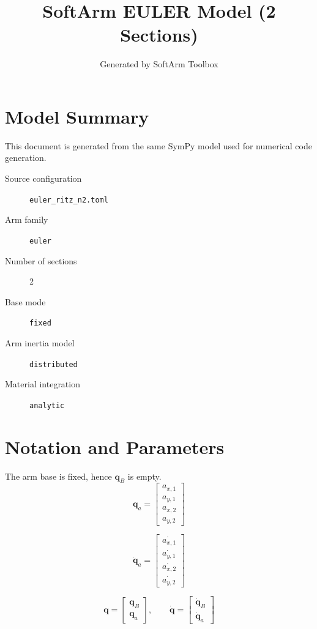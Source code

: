 \documentclass[11pt]{article}
\title{SoftArm EULER Model (2 Sections)}
\author{Generated by SoftArm Toolbox}
\date{}
\begin{document}
\maketitle

\section{Model Summary}
This document is generated from the same SymPy model used for numerical code generation.
\begin{description}
\item[Source configuration] \texttt{euler\_ritz\_n2.toml}
\item[Arm family] \texttt{euler}
\item[Number of sections] 2
\item[Base mode] \texttt{fixed}
\item[Arm inertia model] \texttt{distributed}
\item[Material integration] \texttt{analytic}
\end{description}

\section{Notation and Parameters}
The arm base is fixed, hence $\boldsymbol q_B$ is empty.
\begin{equation}
\boldsymbol q_a=\begin{bmatrix}a_{x,1}\\a_{y,1}\\a_{x,2}\\a_{y,2}\end{bmatrix}
\end{equation}

\begin{equation}
\dot{\boldsymbol q}_a=\begin{bmatrix}\dot{a_{x,1}}\\\dot{a_{y,1}}\\\dot{a_{x,2}}\\\dot{a_{y,2}}\end{bmatrix}
\end{equation}

\begin{equation}
\boldsymbol q=\begin{bmatrix}\boldsymbol q_B\\\boldsymbol q_a\end{bmatrix},\qquad \dot{\boldsymbol q}=\begin{bmatrix}\dot{\boldsymbol q}_B\\\dot{\boldsymbol q}_a\end{bmatrix}
\end{equation}
\end{document}
